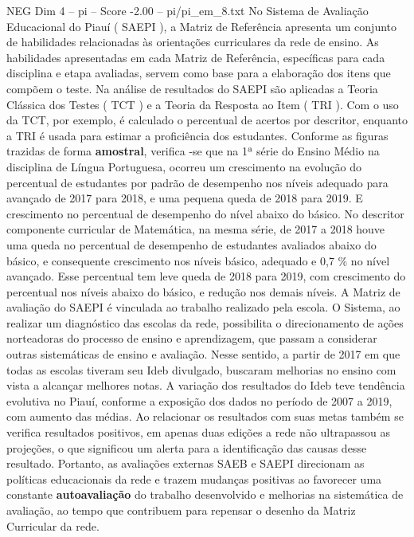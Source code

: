 \begin{textsample}{NEG Dim 4 – pi – Score -2.00 – pi/pi\_em\_8.txt}  \label{ex:f4_neg_164}
No Sistema de Avaliação Educacional do Piauí ( SAEPI ), a Matriz de Referência apresenta um conjunto de habilidades relacionadas às orientações curriculares da rede de ensino.
As habilidades apresentadas em cada Matriz de Referência, específicas para cada disciplina e etapa avaliadas, servem como base para a elaboração dos itens que compõem o teste.
Na análise de resultados do SAEPI são aplicadas a Teoria Clássica dos Testes ( TCT ) e a Teoria da Resposta ao Item ( TRI ).
Com o uso da TCT, por exemplo, é calculado o percentual de acertos por descritor, enquanto a TRI é usada para estimar a proficiência dos estudantes.
Conforme as figuras trazidas de forma \textbf{amostral}, verifica -se que na 1ª série do Ensino Médio na disciplina de Língua Portuguesa, ocorreu um crescimento na evolução do percentual de estudantes por padrão de desempenho nos níveis adequado para avançado de 2017 para 2018, e uma pequena queda de 2018 para 2019.
E crescimento no percentual de desempenho do nível abaixo do básico.
No descritor componente curricular de Matemática, na mesma série, de 2017 a 2018 houve uma queda no percentual de desempenho de estudantes avaliados abaixo do básico, e consequente crescimento nos níveis básico, adequado e 0,7 \% no nível avançado.
Esse percentual tem leve queda de 2018 para 2019, com crescimento do percentual nos níveis abaixo do básico, e redução nos demais níveis.
A Matriz de avaliação do SAEPI é vinculada ao trabalho realizado pela escola.
O Sistema, ao realizar um diagnóstico das escolas da rede, possibilita o direcionamento de ações norteadoras do processo de ensino e aprendizagem, que passam a considerar outras sistemáticas de ensino e avaliação.
Nesse sentido, a partir de 2017 em que todas as escolas tiveram seu Ideb divulgado, buscaram melhorias no ensino com vista a alcançar melhores notas.
A variação dos resultados do Ideb teve tendência evolutiva no Piauí, conforme a exposição dos dados no período de 2007 a 2019, com aumento das médias.
Ao relacionar os resultados com suas metas também se verifica resultados positivos, em apenas duas edições a rede não ultrapassou as projeções, o que significou um alerta para a identificação das causas desse resultado.
Portanto, as avaliações externas SAEB e SAEPI direcionam as políticas educacionais da rede e trazem mudanças positivas ao favorecer uma constante \textbf{autoavaliação} do trabalho desenvolvido e melhorias na sistemática de avaliação, ao tempo que contribuem para repensar o desenho da Matriz Curricular da rede.

\end{textsample}
